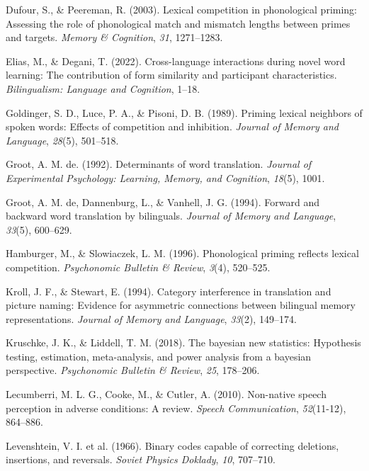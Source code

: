 \documentclass[
]{article}
\newlength{\cslhangindent}
\newenvironment{CSLReferences}[2] %
 {\begin{list}{}{%
  \setlength{\itemindent}{0pt}
  \setlength{\leftmargin}{0pt}
  \setlength{\parsep}{0pt}
  \ifodd #1
   \setlength{\leftmargin}{\cslhangindent}
   \setlength{\itemindent}{-1\cslhangindent}
  \fi
  \setlength{\itemsep}{#2\baselineskip}}}
 {\end{list}}
\begin{document}
\begin{CSLReferences}{1}{0}
Dufour, S., \& Peereman, R. (2003). Lexical competition in phonological
priming: Assessing the role of phonological match and mismatch lengths
between primes and targets. \emph{Memory \& Cognition}, \emph{31},
1271--1283.

Elias, M., \& Degani, T. (2022). Cross-language interactions during
novel word learning: The contribution of form similarity and participant
characteristics. \emph{Bilingualism: Language and Cognition}, 1--18.

Goldinger, S. D., Luce, P. A., \& Pisoni, D. B. (1989). Priming lexical
neighbors of spoken words: Effects of competition and inhibition.
\emph{Journal of Memory and Language}, \emph{28}(5), 501--518.

Groot, A. M. de. (1992). Determinants of word translation. \emph{Journal
of Experimental Psychology: Learning, Memory, and Cognition},
\emph{18}(5), 1001.

Groot, A. M. de, Dannenburg, L., \& Vanhell, J. G. (1994). Forward and
backward word translation by bilinguals. \emph{Journal of Memory and
Language}, \emph{33}(5), 600--629.

Hamburger, M., \& Slowiaczek, L. M. (1996). Phonological priming
reflects lexical competition. \emph{Psychonomic Bulletin \& Review},
\emph{3}(4), 520--525.

Kroll, J. F., \& Stewart, E. (1994). Category interference in
translation and picture naming: Evidence for asymmetric connections
between bilingual memory representations. \emph{Journal of Memory and
Language}, \emph{33}(2), 149--174.

Kruschke, J. K., \& Liddell, T. M. (2018). The bayesian new statistics:
Hypothesis testing, estimation, meta-analysis, and power analysis from a
bayesian perspective. \emph{Psychonomic Bulletin \& Review}, \emph{25},
178--206.

Lecumberri, M. L. G., Cooke, M., \& Cutler, A. (2010). Non-native speech
perception in adverse conditions: A review. \emph{Speech Communication},
\emph{52}(11-12), 864--886.

Levenshtein, V. I. et al. (1966). Binary codes capable of correcting
deletions, insertions, and reversals. \emph{Soviet Physics Doklady},
\emph{10}, 707--710.


\end{CSLReferences}
\end{document}
